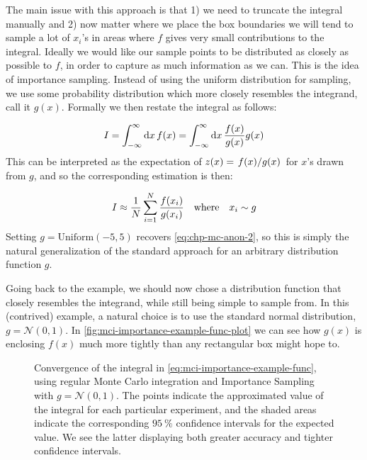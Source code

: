\documentclass[Thesis.tex]{subfiles}
\begin{document}
The main issue with this approach is that 1) we need to truncate the integral
manually and 2) now matter where we place the box boundaries we will tend to
sample a lot of $x_i$'s in areas where $f$ gives very small contributions to
the integral. Ideally we would like our sample points to be distributed as
closely as possible to $f$, in order to capture as much information as we can.
This is the idea of importance sampling. Instead of using the uniform
distribution for sampling, we use some probability distribution which more
closely resembles the integrand, call it $g(x)$. Formally we then restate the integral as follows:

\begin{align}
    I = \int_{-\infty}^{\infty}\dd{x}f(x) = \int_{-\infty}^{\infty}\dd{x} \frac{f(x)}{g(x)} g(x)
\end{align}
This can be interpreted as the expectation of $z(x)=\flatfrac{f(x)}{g(x)}$ for $x$'s drawn from $g$, and so the corresponding estimation is then:

\begin{align}
    I \approx \frac{1}{N} \sum_{i=1}^N \frac{f(x_i)}{g(x_i)} \qq{where} x_i\sim g
\end{align}
Setting $g = \text{Uniform}(-5, 5)$ recovers \autoref{eq:chp-mc-anon-2}, so this is simply the natural generalization of the standard approach for an arbitrary distribution function $g$.


Going back to the example, we should now chose a distribution function that
closely resembles the integrand, while still being simple to sample from. In
this (contrived) example, a natural choice is to use the standard normal
distribution, $g = \mathcal{N}(0, 1)$. In
\autoref{fig:mci-importance-example-func-plot} we can see how $g(x)$ is
enclosing $f(x)$ much more tightly than any rectangular box might hope to.

\begin{figure}
   \centering
    \resizebox{0.7\linewidth}{!}{%
        
    }
    \caption{\label{fig:mci-importance-example-func-convergence}Convergence of
    the integral in \autoref{eq:mci-importance-example-func}, using regular
    Monte Carlo integration and Importance Sampling with $g = \mathcal{N}(0,
    1)$. The points indicate the approximated value of the integral for each
    particular experiment, and the shaded areas indicate the corresponding
    $\SI{95}{\percent}$ confidence intervals for the expected value. We see the
    latter displaying both greater accuracy and tighter confidence intervals.
    }
\end{figure}
\end{document}
